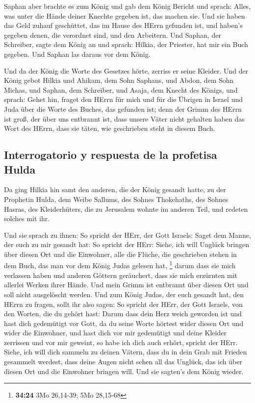  Saphan aber brachte es zum König und gab dem König
Bericht und sprach: Alles, was unter die Hände deiner Knechte gegeben
ist, das machen sie.  Und sie haben das Geld zuhauf
geschüttet, das im Hause des HErrn gefunden ist, und haben's gegeben
denen, die verordnet sind, und den Arbeitern.  Und
Saphan, der Schreiber, sagte dem König an und sprach: Hilkia, der
Priester, hat mir ein Buch gegeben. Und Saphan las daraus vor dem König.

 Und da der König die Worte des Gesetzes hörte, zerriss
er seine Kleider.  Und der König gebot Hilkia und Ahikam,
dem Sohn Saphans, und Abdon, dem Sohn Michas, und Saphan, dem Schreiber,
und Asaja, dem Knecht des Königs, und sprach:  Gehet hin,
fraget den HErrn für mich und für die Übrigen in Israel und Juda über
die Worte des Buches, das gefunden ist; denn der Grimm des HErrn ist
groß, der über uns entbrannt ist, dass unsere Väter nicht gehalten haben
das Wort des HErrn, dass sie täten, wie geschrieben steht in diesem
Buch.

\hypertarget{interrogatorio-y-respuesta-de-la-profetisa-hulda}{%
\subsection{Interrogatorio y respuesta de la profetisa
Hulda}\label{interrogatorio-y-respuesta-de-la-profetisa-hulda}}

 Da ging Hilkia hin samt den anderen, die der König
gesandt hatte, zu der Prophetin Hulda, dem Weibe Sallums, des Sohnes
Thokehaths, des Sohnes Hasras, des Kleiderhüters, die zu Jerusalem
wohnte im anderen Teil, und redeten solches mit ihr.

 Und sie sprach zu ihnen: So spricht der HErr, der Gott
Israels: Saget dem Manne, der euch zu mir gesandt hat: 
So spricht der HErr: Siehe, ich will Unglück bringen über diesen Ort und
die Einwohner, alle die Flüche, die geschrieben stehen in dem Buch, das
man vor dem König Judas gelesen hat, \footnote{\textbf{34:24} 3Mo
  26,14-39; 5Mo 28,15-68}  darum dass sie mich verlassen
haben und anderen Göttern geräuchert, dass sie mich erzürnten mit
allerlei Werken ihrer Hände. Und mein Grimm ist entbrannt über diesen
Ort und soll nicht ausgelöscht werden.  Und zum König
Judas, der euch gesandt hat, den HErrn zu fragen, sollt ihr also sagen:
So spricht der HErr, der Gott Israels, von den Worten, die du gehört
hast:  Darum dass dein Herz weich geworden ist und hast
dich gedemütigt vor Gott, da du seine Worte hörtest wider diesen Ort und
wider die Einwohner, und hast dich vor mir gedemütigt und deine Kleider
zerrissen und vor mir geweint, so habe ich dich auch erhört, spricht der
HErr.  Siehe, ich will dich sammeln zu deinen Vätern,
dass du in dein Grab mit Frieden gesammelt werdest, dass deine Augen
nicht sehen all das Unglück, das ich über diesen Ort und die Einwohner
bringen will. Und sie sagten's dem König wieder.

